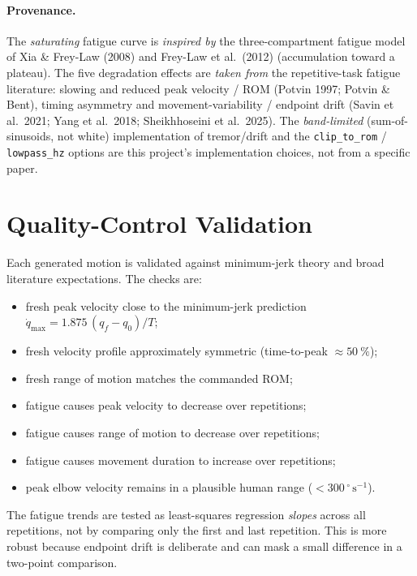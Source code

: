 \documentclass[11pt]{article}
\newcommand{\dg}{^{\circ}}
\begin{document}
\paragraph{Provenance.} The \emph{saturating} fatigue curve is \textit{inspired
by} the three-compartment fatigue model of Xia \& Frey-Law (2008) and Frey-Law
et al.\ (2012) (accumulation toward a plateau). The five degradation effects are
\textit{taken from} the repetitive-task fatigue literature: slowing and reduced
peak velocity / ROM (Potvin 1997; Potvin \& Bent), timing asymmetry and
movement-variability / endpoint drift (Savin et al.\ 2021; Yang et al.\ 2018;
Sheikhhoseini et al.\ 2025). The \emph{band-limited} (sum-of-sinusoids, not white)
implementation of tremor/drift and the \texttt{clip\_to\_rom} / \texttt{lowpass\_hz}
options are this project's implementation choices, not from a specific paper.

\section{Quality-Control Validation}

Each generated motion is validated against minimum-jerk theory and broad
literature expectations. The checks are:
\begin{itemize}\itemsep2pt
  \item fresh peak velocity close to the minimum-jerk prediction
        $\dot q_{\max} = 1.875\,(q_f - q_0)/T$;
  \item fresh velocity profile approximately symmetric (time-to-peak $\approx \SI{50}{\percent}$);
  \item fresh range of motion matches the commanded ROM;
  \item fatigue causes peak velocity to decrease over repetitions;
  \item fatigue causes range of motion to decrease over repetitions;
  \item fatigue causes movement duration to increase over repetitions;
  \item peak elbow velocity remains in a plausible human range ($<300\,\dg\,\mathrm{s}^{-1}$).
\end{itemize}

The fatigue trends are tested as least-squares regression \emph{slopes} across all
repetitions, not by comparing only the first and last repetition. This is more
robust because endpoint drift is deliberate and can mask a small difference in a
two-point comparison.
\end{document}
